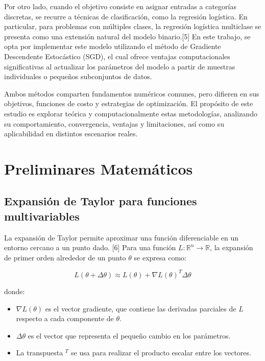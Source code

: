 \documentclass[12pt, letterpaper,conference]{IEEEtran}
\begin{document}
Por otro lado, cuando el objetivo consiste en asignar entradas a categorías discretas, se recurre a técnicas de clasificación, como la regresión logística. En particular, para problemas con múltiples clases, la regresión logística multiclase se presenta como una extensión natural del modelo binario.[5] En este trabajo, se opta por implementar este modelo utilizando el método de Gradiente Descendente Estocástico (SGD), el cual ofrece ventajas computacionales significativas al actualizar los parámetros del modelo a partir de muestras individuales o pequeños subconjuntos de datos.

Ambos métodos comparten fundamentos numéricos comunes, pero difieren en sus objetivos, funciones de costo y estrategias de optimización. El propósito de este estudio es explorar teórica y computacionalmente estas metodologías, analizando su comportamiento, convergencia, ventajas y limitaciones, así como su aplicabilidad en distintos escenarios reales.

\vspace{0.5cm}


\section{Preliminares Matemáticos}

\vspace{0.25cm}

\subsection{Expansión de Taylor para funciones multivariables}

La expansión de Taylor permite aproximar una función diferenciable en un entorno cercano a un punto dado. [6] Para una función \( L: \mathbb{R}^n \rightarrow \mathbb{R} \), la expansión de primer orden alrededor de un punto \( \theta \) se expresa como:

\[
L(\theta + \Delta \theta) \approx L(\theta) + \nabla L(\theta)^T \Delta \theta
\]

donde:
\begin{itemize}
    \item \( \nabla L(\theta) \) es el vector gradiente, que contiene las derivadas parciales de \( L \) respecto a cada componente de \( \theta \).
    \item \( \Delta \theta \) es el vector que representa el pequeño cambio en los parámetros.
    \item La transpuesta \( ^T \) se usa para realizar el producto escalar entre los vectores.
\end{itemize}
\end{document}
